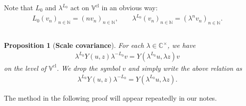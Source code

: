 \documentclass[12pt,a4paper,notitlepage]{article}
\theoremstyle{definition}
\theoremstyle{plain}
\newtheorem{pp}[df]{Proposition}
\newcommand{\Vbb}{\mathbb V}
\newcommand{\Cbb}{\mathbb C}
\newcommand{\Nbb}{\mathbb N}
\newcommand{\cl}{\mathrm{cl}}
\numberwithin{equation}{section}
\begin{document}
Note that $L_0$ and $\lambda^{L_0}$ act on $\Vbb^\cl$ in an  obvious way:
\begin{gather*}
L_0(v_n)_{n\in\Nbb}=(nv_n)_{n\in\Nbb},\qquad \lambda^{L_0}	(v_n)_{n\in\Nbb}=(\lambda^n v_n)_{n\in\Nbb}.
\end{gather*}




\subsection{}








\begin{pp}[\textbf{Scale covariance}]\label{lb63}
For each $\lambda\in\Cbb^\times$, we have
\begin{align}
\lambda^{L_0}Y(u,z)\lambda^{-L_0}v=Y(\lambda^{L_0}u,\lambda z)v\label{eq23}
\end{align}
on the level of $\Vbb^\cl$. We drop the symbol $v$ and simply write the above relation as
\begin{align*}
\lambda^{L_0}Y(u,z)\lambda^{-L_0}=Y(\lambda^{L_0}u,\lambda z).
\end{align*}
\end{pp}

The method in the following proof will appear repeatedly in our notes. 
\end{document}
